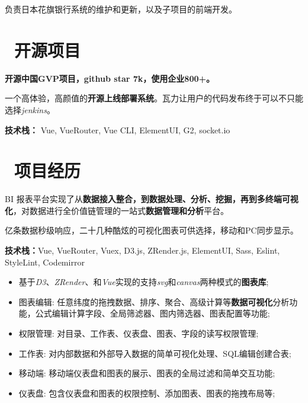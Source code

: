 \documentclass{resume}
\begin{document}
\begin{onehalfspacing}
负责日本花旗银行系统的维护和更新，以及子项目的前端开发。
\end{onehalfspacing}

\section{\faUsers\ 开源项目}

\begin{onehalfspacing}
\textbf{开源中国GVP项目，github star 7k，使用企业800+。}

一个高体验，高颜值的\textbf{开源上线部署系统}。瓦力让用户的代码发布终于可以不只能选择\textit{jenkins}。


\textbf{技术栈：} Vue, VueRouter, Vue CLI, ElementUI, G2, socket.io
\end{onehalfspacing}


\section{\faUsers\ 项目经历}

\begin{onehalfspacing}
BI 报表平台实现了从\textbf{数据接入整合，到数据处理、分析、挖掘，再到多终端可视化}，对数据进行全价值链管理的一站式\textbf{数据管理和分析}平台。


亿条数据秒级响应，二十几种酷炫的可视化图表可供选择，移动和PC同步显示。

\textbf{技术栈：}Vue, VueRouter, Vuex, D3.js, ZRender.js, ElementUI, Sass, Eslint, StyleLint, Codemirror
\begin{itemize}
  \item 基于\textit{D3}、\textit{ZRender}、和\textit{Vue}实现的支持\textit{svg}和\textit{canvas}两种模式的\textbf{图表库};
  \item 图表编辑: 任意纬度的拖拽数据、排序、聚合、高级计算等\textbf{数据可视化}分析功能，公式编辑计算字段、全局筛滤器、图内筛选器、图表配置等功能;
  \item 权限管理: 对目录、工作表、仪表盘、图表、字段的读写权限管理;
  \item 工作表: 对内部数据和外部导入数据的简单可视化处理、SQL编辑创建合表;
  \item 移动端: 移动端仪表盘和图表的展示、图表的全局过滤和简单交互功能;
  \item 仪表盘: 包含仪表盘和图表的权限控制、添加图表、图表的拖拽布局等;
\end{itemize}
\end{onehalfspacing}
\end{document}

